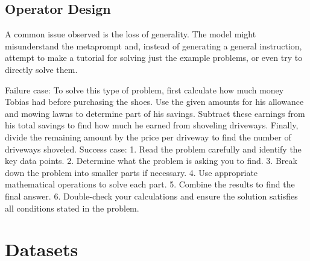 \subsection{Operator Design}


A common issue observed is the loss of generality.
The model might misunderstand the metaprompt and, instead of generating a general instruction, attempt to
make a tutorial for solving just the example problems, or even try to directly solve them.

Failure case:
To solve this type of problem, first calculate how much money Tobias had before purchasing the shoes. Use the given amounts for his allowance and mowing lawns to determine part of his savings. Subtract these earnings from his total savings to find how much he earned from shoveling driveways. Finally, divide the remaining amount by the price per driveway to find the number of driveways shoveled.
Success case:
1. Read the problem carefully and identify the key data points. 2. Determine what the problem is asking you to find. 3. Break down the problem into smaller parts if necessary. 4. Use appropriate mathematical operations to solve each part. 5. Combine the results to find the final answer. 6. Double-check your calculations and ensure the solution satisfies all conditions stated in the problem.


\section{Datasets}
